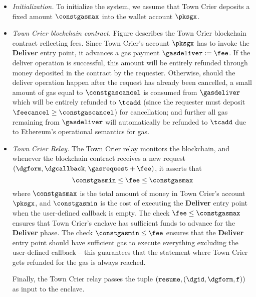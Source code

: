 \begin{itemize}[leftmargin=5mm]
\item
{\it Initialization.}
To initialize the system, we assume that Town Crier 
deposits a fixed amount $\constgasmax$ 
into the wallet account $\pksgx$.
\item
{\it Town Crier blockchain contract.}
Figure  describes the  
Town Crier blockchain contract reflecting fees.
Since Town Crier's account 
$\pksgx$ has to invoke the {\bf Deliver} entry point, it 
advances a gas payment 
$\gasdeliver := \fee$.
If the deliver operation is successful, 
this amount will be entirely refunded through money deposited in the contract 
by the requester.
Otherwise, should the deliver operation happen after the request has already
been cancelled, 
a small amount of gas equal to $\constgascancel$ 
is consumed from $\gasdeliver$
which will be entirely refunded 
to $\tcadd$ (since the requester must deposit $\feecancel \geq \constgascancel$) for cancellation;
and further all gas remaining  
from $\gasdeliver$ will automatically 
be refunded to $\tcadd$ due to Ethereum's operational semantics for gas. 
\item
{\it Town Crier Relay.}
The Town Crier relay monitors
the blockchain, and whenever
the blockchain contract \tcont
receives a new request $(\dgform, \dgcallback, 
\gasrequest+\fee)$,
it asserts that 
\[
\constgasmin
\leq \fee \leq \constgasmax
\]
where $\constgasmax$ is the total amount of money
in Town Crier's account $\pksgx$, 
and $\constgasmin$
is the cost of executing the {\bf Deliver} entry point 
when the user-defined callback is empty.
The check 
$\fee \leq \constgasmax$
ensures that Town Crier's enclave  
has sufficient funds to advance
for the {\bf Deliver} phase.
The check 
$\constgasmin \leq \fee$
ensures that 
the {\bf Deliver} entry point should 
have sufficient gas to execute everything excluding the user-defined
callback -- this guarantees that the statement
where Town Crier gets refunded for the gas is always reached.


Finally, the Town Crier relay passes
the tuple $({\tt resume}, (\dgid, \dgform, {\tt f}))$
as input to the enclave.



\end{itemize}
